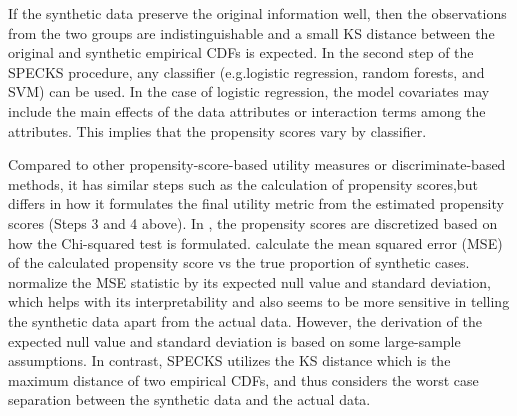\documentclass[12pt, A4]{article}
\theoremstyle{plain}
\theoremstyle{exampstyle}\newtheorem{defn}{Definition}
\theoremstyle{exampstyle}\newtheorem{lem}{Lemma}
\theoremstyle{exampstyle}\newtheorem{cor}{Corollary}
\theoremstyle{exampstyle}\newtheorem{pro}{Proposition}
\theoremstyle{exampstyle}\newtheorem{cla}{Claim}
\theoremstyle{exampstyle}\newtheorem{rem}{Remark}
\begin{document}
If the synthetic data preserve the original information well, then the observations from the two groups are indistinguishable and a small KS distance between the original and synthetic empirical CDFs is expected.   In the second step of the SPECKS procedure, any classifier (e.g.logistic regression, random forests, and SVM) can be used. In the case of logistic regression, the model covariates may include the main effects of the data attributes or interaction terms among the attributes. This implies that the propensity scores vary by classifier. 

Compared to other propensity-score-based utility measures or discriminate-based methods, it has similar steps such as the calculation of propensity scores,but differs in how it formulates the final utility metric from the estimated propensity scores (Steps 3 and 4 above). In \citet{sakshaug2010synthetic}, the propensity scores are discretized based on how the Chi-squared test is formulated. \citet{woo2009global} calculate the mean squared error (MSE) of the calculated propensity score vs the true proportion of synthetic cases. \cite{snoke2018general} normalize the MSE statistic by its expected null value and standard deviation, which helps with its interpretability and also seems to be more sensitive in telling the synthetic data apart from the actual data. However, the derivation of the expected null  value and standard deviation is based on some large-sample assumptions. In contrast, SPECKS utilizes the KS distance which is the maximum distance of two empirical CDFs, and thus considers the worst case separation between the synthetic data and the actual data.
\end{document}
